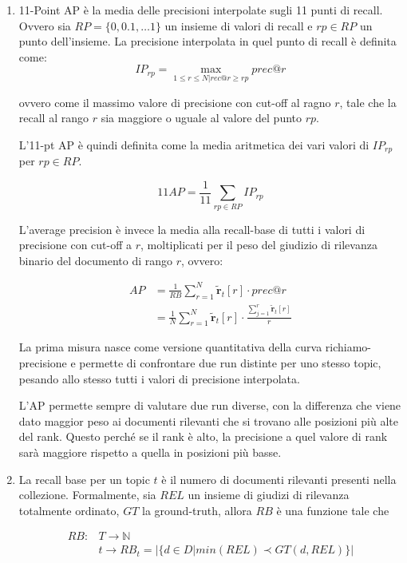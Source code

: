 \begin{enumerate}
	\item 11-Point AP è la media delle precisioni interpolate sugli 11 punti di recall. Ovvero sia $RP=\{0, 0.1, \ldots 1\}$ un insieme di valori di recall e $rp \in RP$ un punto dell'insieme. La precisione interpolata in quel punto di recall è definita come:
	$$
	IP_{rp} = \max\limits_{1 \leq r \leq N | rec@r \geq rp} prec@r
	$$
	
	ovvero come il massimo valore di precisione con cut-off al ragno $r$, tale che la recall al rango $r$ sia maggiore o uguale al valore del punto $rp$.
	
	L'11-pt AP è quindi definita come la media aritmetica dei vari valori di $IP_{rp}$ per $rp \in RP$.
	
	$$
	11AP = \frac{1}{11}\sum\limits_{rp \in RP} IP_{rp}
	$$
	
	L'average precision è invece la media alla recall-base di tutti i valori di precisione con cut-off a $r$, moltiplicati per il peso del giudizio di rilevanza binario del documento di rango $r$, ovvero:
	
	\begin{align*}
	AP &= \frac{1}{RB} \sum\limits_{r = 1}^{N} \tilde{\mathbf{r}}_t[r]\cdot prec@r \\
	&= \frac{1}{N} \sum\limits_{r = 1}^{N} \tilde{\mathbf{r}}_t[r]\cdot \frac{\sum\limits_{j = 1}^{r} \tilde{\mathbf{r}}_t[r]}{r}
	\end{align*}
	
	La prima misura nasce come versione quantitativa della curva richiamo-precisione e permette di confrontare due run distinte per uno stesso topic, pesando allo stesso tutti i valori di precisione interpolata.
	
	L'AP permette sempre di valutare due run diverse, con la differenza che viene dato maggior peso ai documenti rilevanti che si trovano alle posizioni più alte del rank. Questo perché se il rank è alto, la precisione a quel valore di rank sarà maggiore rispetto a quella in posizioni più basse.
	
	\item La recall base per un topic $t$ è il numero di documenti rilevanti presenti nella collezione. Formalmente, sia $REL$ un insieme di giudizi di rilevanza totalmente ordinato, $GT$ la ground-truth, allora $RB$ è una funzione tale che
	
	\begin{align*}
		RB:&T \to \mathbb{N} \\
			& t \to RB_t =  |\{ d \in D | min(REL) \prec GT(d, REL) \}|
	\end{align*}


\end{enumerate}
